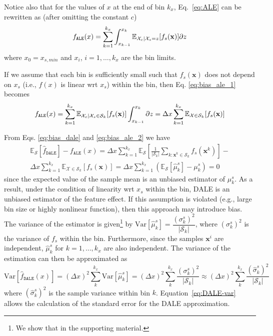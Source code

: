 \documentclass[wcp]{jmlr}
\newcommand{\dale}{\hat{f}_{\mathtt{DALE}}}
\newcommand{\xb}{\mathbf{x}} \newcommand{\R}{\mathbb{R}}
\begin{document}
\noindent
Notice also that for the values of \(x\) at the end of bin \(k_x\),
Eq.~\eqref{eq:ALE} can be rewritten as (after omitting the constant
\(c\))
\begin{equation}
  f_{\mathtt{ALE}}(x) = \sum_{k = 1}^{k_x}\int_{x_{k-1}}^{x_k}
    \mathbb{E}_{\Xcb|\mathcal{X}_s=z}[f_s(\xb)] \partial z
    \label{eq:bias_ale_1}
\end{equation}
where \(x_0=x_{s, min}\) and \(x_i\), \(i=1, \dotsc, k_x\) are the bin limits.

\noindent
If we assume that each bin is sufficiently small such that \(f_s(\xb)\) does
not depend on \(x_s\) (i.e., \(f(x)\) is linear wrt \(x_s\)) within the bin, then
Eq. \eqref{eq:bias_ale_1} becomes
\begin{equation}
  f_{\mathtt{ALE}}(x) = \sum_{k = 1}^{k_x}\mathbb{E}_{\Xcb|\mathcal{X}_s \in
    \mathcal{S}_k}[f_s(\xb)]\int_{x_{k-1}}^{x_k} \partial z
  = \Delta x\sum_{k=1}^{k_x}\mathbb{E}_{\mathcal{X} \in \mathcal{S}_k}[f_s(\xb)]
    \label{eq:bias_ale_2}
\end{equation}

\noindent
From Eqs. \eqref{eq:bias_dale} and \eqref{eq:bias_ale_2} we have
\begin{multline}
    \mathbb{E}_{\mathcal{S}}[\dale]  - f_{\mathtt{ALE}}(x) =
    \Delta x\sum_{k=1}^{k_x}\mathbb{E}_{\mathcal{S}}[\frac{1}{|\mathcal{S}_k|}\sum_{k:\xb^k \in
        \mathcal{S}_k} f_s(\xb^k)] - \\
    \Delta x\sum_{k=1}^{k_x}\mathbb{E}_{\mathcal{X}\in \mathcal{S}_k}[f_s(\xb)] =
  \Delta x\sum_{k=1}^{k_x}\left(\mathbb{E}_{\mathcal{S}}[\hat{\mu}_k^s] - \mu_k^s\right) = 0
\end{multline}
since the expected value of the sample mean is an unbiased estimator
of \(\mu_k^s\). As a result, under the condition of linearity wrt
\(x_s\) within the bin, DALE is an unbiased estimator of the feature
effect. If this assumption is violated (e.g., large bin size or highly
nonlinear function), then this approach may introduce bias. The
variance of the estimator is given\footnote{We show that in the
  supporting material.} by
\( \mathrm{Var}[\hat{\mu}_k^s] =
\dfrac{(\sigma_k^s)^2}{|\mathcal{S}_k|} \), where \((\sigma_k^s)^2\)
is the variance of \(f_s\) within the bin. Furthermore, since the
samples \(\xb^i\) are independent, \(\hat{\mu}_k^s\) for
\(k=1,\dotsc,k_x\) are also independent. The variance of the
estimation can then be approximated as
%
\begin{equation}
  \mathrm{Var}[\dale(x)] = (\Delta x)^2\sum_k^{k_x} \mathrm{Var} [\hat{\mu}_k^s]
  = (\Delta x)^2 \sum_k^{k_x}  \dfrac{(\sigma_k^s)^2}{|\mathcal{S}_k|} \approx
  (\Delta x)^2 \sum_k^{k_x}  \dfrac{(\hat{\sigma}_k^s)^2}{|\mathcal{S}_k|}
  \label{eq:DALE-var}
\end{equation}
%
where \((\hat{\sigma}_k^s)^2\) is the sample variance within bin
\(k\). Equation~\eqref{eq:DALE-var} allows the calculation of the
standard error for the DALE approximation.
\end{document}
